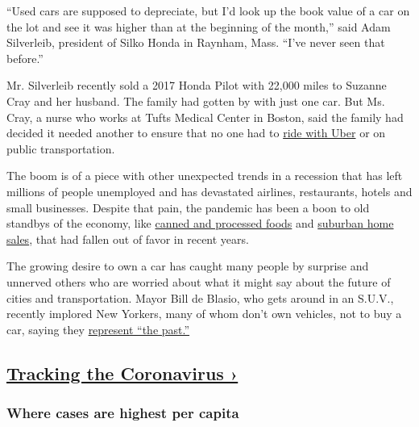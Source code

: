 ``Used cars are supposed to depreciate, but I'd look up the book value
of a car on the lot and see it was higher than at the beginning of the
month,'' said Adam Silverleib, president of Silko Honda in Raynham,
Mass. ``I've never seen that before.''

Mr. Silverleib recently sold a 2017 Honda Pilot with 22,000 miles to
Suzanne Cray and her husband. The family had gotten by with just one
car. But Ms. Cray, a nurse who works at Tufts Medical Center in Boston,
said the family had decided it needed another to ensure that no one had
to
\href{https://www.nytimes3xbfgragh.onion/2020/05/07/technology/the-results-are-in-for-the-sharing-economy-they-are-ugly.html}{ride
with Uber} or on public transportation.

The boom is of a piece with other unexpected trends in a recession that
has left millions of people unemployed and has devastated airlines,
restaurants, hotels and small businesses. Despite that pain, the
pandemic has been a boon to old standbys of the economy, like
\href{https://www.nytimes3xbfgragh.onion/2020/04/07/business/coronavirus-processed-foods.html}{canned
and processed foods} and
\href{https://www.nytimes3xbfgragh.onion/2020/08/30/nyregion/nyc-suburbs-housing-demand.html}{suburban
home sales}, that had fallen out of favor in recent years.

The growing desire to own a car has caught many people by surprise and
unnerved others who are worried about what it might say about the future
of cities and transportation. Mayor Bill de Blasio, who gets around in
an S.U.V., recently implored New Yorkers, many of whom don't own
vehicles, not to buy a car, saying they
\href{https://www.nytimes3xbfgragh.onion/2020/08/12/style/car-buying-new-york-coronavirus.html}{represent
``the past.''}

\hypertarget{tracking-the-coronavirus-}{%
\subsection{\texorpdfstring{\href{https://www.nytimes3xbfgragh.onion/interactive/2020/us/coronavirus-us-cases.html}{Tracking
the Coronavirus
›}}{Tracking the Coronavirus ›}}\label{tracking-the-coronavirus-}}

\href{https://www.nytimes3xbfgragh.onion/interactive/2020/us/coronavirus-us-cases.html}{}

\hypertarget{where-cases-are-highest-per-capita}{%
\subsubsection{\texorpdfstring{Where cases are \textbf{highest} per
capita}{Where cases are highest per capita}}\label{where-cases-are-highest-per-capita}}

